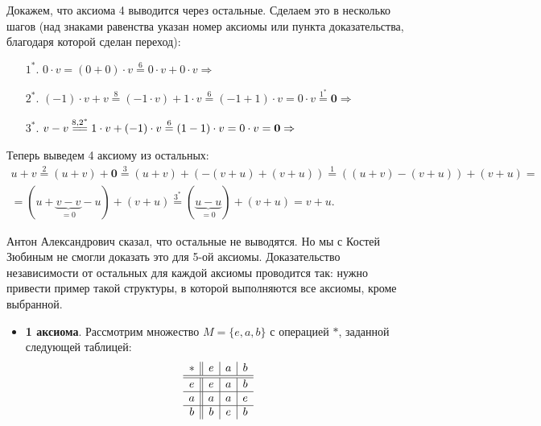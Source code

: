 \begin{remark}
    Докажем, что аксиома 4 выводится через остальные. Сделаем это в несколько шагов (над знаками равенства указан номер аксиомы или пункта доказательства, благодаря которой сделан переход):
    \begin{enumerate}
        \item[$1^\ast$.] $0 \cdot v = (0 + 0) \cdot v \overset{6}{=} 0 \cdot v + 0 \cdot v \Rightarrow $ 
        \item[$2^\ast$.] $(-1) \cdot v + v \overset{8}{=} (-1 \cdot v) + 1 \cdot v \overset{6}{=} (-1 + 1) \cdot v = 0 \cdot v \overset{1^\ast}{=} \boldsymbol{0} \Rightarrow$ 
        \item[$3^\ast$.] $v - v \overset{8, 2^\ast}{=\joinrel=} 1 \cdot v + (-1) \cdot v \overset{6}{=} (1 - 1) \cdot v = 0 \cdot v = \boldsymbol{0} \Rightarrow$ 
    \end{enumerate}

    Теперь выведем 4 аксиому из остальных:
    $$
    \begin{array}{c}\displaystyle
        u + v \overset{2}{=} (u + v) + \boldsymbol{0} \overset{3}{=} (u + v) + (-(v + u) + (v + u)) \overset{1}{=} ((u + v) - (v + u)) + (v + u) = {}\\\displaystyle {} = (u + \underbrace{v - v}_{{} = 0} - u) + (v + u) \overset{3^\ast}{=} (\underbrace{u - u}_{{} = 0}) + (v + u) = v + u.
    \end{array}
    $$

    Антон Александрович сказал, что остальные не выводятся. Но мы с Костей Зюбиным не смогли доказать это для 5-ой аксиомы. Доказательство независимости от остальных для каждой аксиомы проводится так: нужно привести пример такой структуры, в которой выполняются все аксиомы, кроме выбранной.
    \begin{itemize}
        \item \textbf{1 аксиома}. Рассмотрим множество $M = \{e, a, b\}$ с операцией $\ast$, заданной следующей таблицей:
            $$
            \begin{array}{c || c | c | c}
                \ast & e & a & b\\
                \hline\hline
                e & e & a & b\\
                \hline
                a & a & a & e\\
                \hline
                b & b & e & b
            \end{array}
            $$


\end{itemize}
\end{remark}
